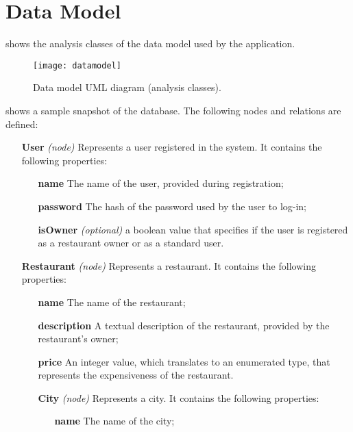\chapter{Data Model}\label{ch:datamodel}

 shows the analysis classes of the data model used by the
application.

\begin{figure}[htb]
	\texttt{[image: datamodel]}
	\caption{Data model UML diagram (analysis classes).}\label{fig:datamodel}
\end{figure}

 shows a sample snapshot of the database. The following nodes
and relations are defined:
\begin{itemize}
    \item[\textbf{User}] \textit{(node)} Represents a user registered in the
        system. It contains the following properties:
        \begin{itemize}
            \item[\textbf{name}] The name of the user, provided during
                registration;
            \item[\textbf{password}] The hash of the password used by the
                user to log-in;
            \item[\textbf{isOwner}] \textit{(optional)} a boolean value that
                specifies if the user is registered as a restaurant owner or
                as a standard user.
        \end{itemize}
    \item[\textbf{Restaurant}] \textit{(node)} Represents a restaurant. It
        contains the following properties:
        \begin{itemize}
            \item[\textbf{name}] The name of the restaurant;
            \item[\textbf{description}] A textual description of the
                restaurant, provided by the restaurant's owner;
            \item[\textbf{price}] An integer value, which translates to an
                enumerated type, that represents the expensiveness of the
                restaurant.
    \item[\textbf{City}] \textit{(node)} Represents a city. It contains the
        following properties:
        \begin{itemize}
            \item[\textbf{name}] The name of the city;

\end{itemize}
\end{itemize}
\end{itemize}
